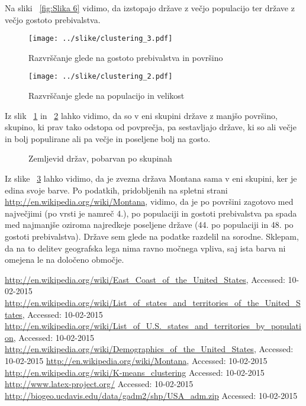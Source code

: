 \documentclass[11pt,a4paper]{article}
\begin{document}
Na sliki ~\ref{fig:Slika 6} vidimo, da izstopajo države z večjo populacijo ter države z večjo gostoto prebivalstva.

\begin{figure}[H]
  \texttt{[image: ../slike/clustering\_3.pdf]}
  \caption{Razvrščanje glede na gostoto prebivalstva in površino}
  \label{fig:Slika 7}
\end{figure}

\begin{figure}[H]
  \texttt{[image: ../slike/clustering\_2.pdf]}
  \caption{Razvrščanje glede na populacijo in velikost}
  \label{fig:Slika 8}
\end{figure}
\pagebreak

Iz slik ~\ref{fig:Slika 7} in ~\ref{fig:Slika 8} lahko vidimo, da so v eni skupini države z manjšo površino, skupino, ki prav tako odstopa od povprečja, pa sestavljajo države, ki so ali večje in bolj populirane ali pa večje in poseljene bolj na gosto. \\

\begin{figure}[H]
  \caption{Zemljevid držav, pobarvan po skupinah}
  \label{fig:Zemljevid 3}
\end{figure}

Iz slike ~\ref{fig:Zemljevid 3} lahko vidimo, da je zvezna država Montana sama v eni skupini, ker je edina svoje barve. Po podatkih, pridobljenih na spletni strani \url{http://en.wikipedia.org/wiki/Montana}, vidimo, da je po površini zagotovo med največjimi (po vrsti je namreč 4.), po populaciji in gostoti prebivalstva pa spada med najmanjše oziroma najredkeje poseljene države (44. po populaciji in 48. po gostoti prebivalstva). Države sem glede na podatke razdelil na sorodne. Sklepam, da na to delitev geografska lega nima ravno močnega vpliva, saj ista barva ni omejena le na določeno območje. \pagebreak

\begin{thebibliography}{9}

  \url{http://en.wikipedia.org/wiki/East_Coast_of_the_United_States},
  {Accessed: 10-02-2015}
  \url{http://en.wikipedia.org/wiki/List_of_states_and_territories_of_the_United_States},
  {Accessed: 10-02-2015}
  \url{http://en.wikipedia.org/wiki/List_of_U.S._states_and_territories_by_population},
  {Accessed: 10-02-2015}
  \url{http://en.wikipedia.org/wiki/Demographics_of_the_United_States},
  {Accessed: 10-02-2015}
  \url{http://en.wikipedia.org/wiki/Montana},
  {Accessed: 10-02-2015}
  \url{http://en.wikipedia.org/wiki/K-means_clustering}
  {Accessed: 10-02-2015}
  \url{http://www.latex-project.org/}
  {Accessed: 10-02-2015}
  \url{http://biogeo.ucdavis.edu/data/gadm2/shp/USA_adm.zip}
  {Accessed: 10-02-2015}
  
\end{thebibliography}
\end{document}
